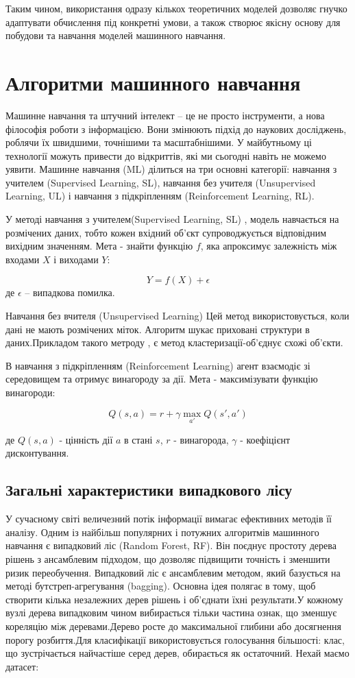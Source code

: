\documentclass[14pt,a4paper,titlepage,oneside]{book}
\numberwithin{equation}{part}
\begin{document}
Таким чином, використання одразу кількох теоретичних моделей дозволяє гнучко адаптувати обчислення під конкретні умови, а також створює якісну основу для побудови та навчання моделей машинного навчання.
\section{Алгоритми машинного навчання}
Машинне навчання та штучний інтелект – це не просто інструменти, а нова філософія роботи з інформацією. Вони змінюють підхід до наукових досліджень, роблячи їх швидшими, точнішими та масштабнішими. У майбутньому ці технології можуть привести до відкриттів, які ми сьогодні навіть не можемо уявити.
Машинне навчання (ML) ділиться на три основні категорії: навчання з учителем (Supervised Learning, SL), навчання без учителя (Unsupervised Learning, UL) і навчання з підкріпленням (Reinforcement Learning, RL).

У  методі навчання з учителем(Supervised Learning, SL) \cite{ml_sr_comp}, модель навчається на розмічених даних, тобто кожен вхідний об'єкт супроводжується відповідним вихідним значенням. Мета - знайти функцію \( f \), яка апроксимує залежність між входами \( X \) і виходами \( Y \):

\[
Y = f(X) + \epsilon
\]
де \( \epsilon \) – випадкова помилка.



Навчання без вчителя (Unsupervised Learning)
Цей метод використовується, коли дані не мають розмічених міток. Алгоритм шукає приховані структури в даних.Прикладом такого метроду , є метод кластеризації-об'єднує схожі об'єкти. 

В навчання з підкріпленням (Reinforcement Learning) агент взаємодіє зі середовищем та отримує винагороду за дії. 
Мета - максимізувати функцію винагороди:

\[
Q(s, a) = r + \gamma \max_{a'} Q(s', a')
\]

де $Q(s, a)$ - цінність дії $a$ в стані $s$, $r$ - винагорода, $\gamma$ - коефіцієнт дисконтування.
\subsection{Загальні характеристики випадкового лісу}

У сучасному світі величезний потік інформації вимагає ефективних методів її аналізу. Одним із найбільш популярних і потужних алгоритмів машинного навчання є випадковий ліс (Random Forest, RF). Він поєднує простоту дерева рішень з ансамблевим підходом, що дозволяє підвищити точність і зменшити ризик переобучення.
Випадковий ліс є ансамблевим методом, який базується на методі бутстреп-агрегування (bagging). Основна ідея полягає в тому, щоб створити кілька незалежних дерев рішень і об'єднати їхні результати.У кожному вузлі дерева випадковим чином вибирається тільки частина ознак, що зменшує кореляцію між деревами.Дерево росте до максимальної глибини або досягнення порогу розбиття.Для класифікації використовується голосування більшості: клас, що зустрічається найчастіше серед дерев, обирається як остаточний.
Нехай маємо датасет:
\end{document}
